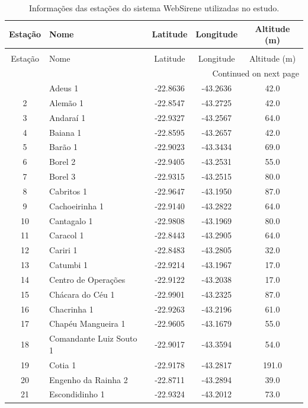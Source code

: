 \begin{longtable}{clccc}
\caption{Informações das estações do sistema WebSirene utilizadas no estudo.} \label{tab:websirene_estacoes_info} \\
\toprule
Estação & Nome & Latitude & Longitude & Altitude (m) \\
\midrule
\endfirsthead
\caption[]{Informações das estações do sistema WebSirene utilizadas no estudo.} \\
\toprule
Estação & Nome & Latitude & Longitude & Altitude (m) \\
\midrule
\endhead
\midrule
\multicolumn{5}{r}{Continued on next page} \\
\midrule
\endfoot
\bottomrule
\endlastfoot
1 & Adeus 1 & -22.8636 & -43.2636 & 42.0 \\
2 & Alemão 1 & -22.8547 & -43.2725 & 42.0 \\
3 & Andaraí 1 & -22.9327 & -43.2567 & 64.0 \\
4 & Baiana 1 & -22.8595 & -43.2657 & 42.0 \\
5 & Barão 1 & -22.9023 & -43.3434 & 69.0 \\
6 & Borel 2 & -22.9405 & -43.2531 & 55.0 \\
7 & Borel 3 & -22.9315 & -43.2515 & 80.0 \\
8 & Cabritos 1 & -22.9647 & -43.1950 & 87.0 \\
9 & Cachoeirinha 1 & -22.9140 & -43.2822 & 64.0 \\
10 & Cantagalo 1 & -22.9808 & -43.1969 & 80.0 \\
11 & Caracol 1 & -22.8443 & -43.2905 & 64.0 \\
12 & Cariri 1 & -22.8483 & -43.2805 & 32.0 \\
13 & Catumbi 1 & -22.9214 & -43.1967 & 17.0 \\
14 & Centro de Operações & -22.9122 & -43.2038 & 17.0 \\
15 & Chácara do Céu 1 & -22.9901 & -43.2325 & 87.0 \\
16 & Chacrinha 1 & -22.9263 & -43.2196 & 61.0 \\
17 & Chapéu Mangueira 1 & -22.9605 & -43.1679 & 55.0 \\
18 & Comandante Luiz Souto 1 & -22.9017 & -43.3594 & 54.0 \\
19 & Cotia 1 & -22.9178 & -43.2817 & 191.0 \\
20 & Engenho da Rainha 2 & -22.8711 & -43.2894 & 39.0 \\
21 & Escondidinho 1 & -22.9324 & -43.2012 & 73.0 \\

\end{longtable}
